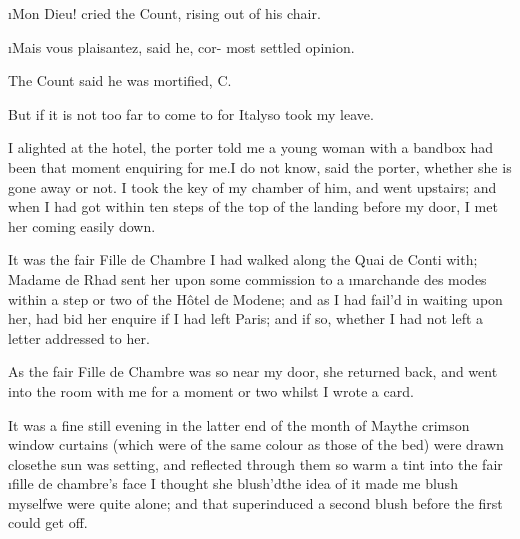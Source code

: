 \documentclass[twoside]{article}
\begin{document}
\i{Mon Dieu!} cried the Count, rising\break
out of his chair.

\i{Mais vous plaisantez}, said he, cor-\break
{}
most settled opinion.

The Count said he was mortified,\break
{}
C\anon.

But if it is not too far to come to\break
{}
for Italy\tskk so took my leave.



\vskip 0pt

 I alighted at the hotel,\break
the porter told me a young woman with a
bandbox had been that moment enquiring for
me.\tskk I do not know, said the porter,
whether she is gone away or not.  I took
the key of my chamber of him, and went
upstairs; and when I had got within ten
steps of the top of the landing before my
door, I met her coming easily down.

It was the fair Fille de Chambre I had
walked along the Quai de Conti with;
Madame de R\tskk  had sent her upon some
commission to a \i{marchande des modes}
within a step or two of the Hôtel de
Modene; and as I had fail’d in waiting
upon her, had bid her enquire if I had
left Paris; and if so, whether I had not
left a letter addressed to her.

As the fair Fille de Chambre was so
near my door, she returned back, and went
into the room with me for a moment or two
whilst I wrote a card.

It was a fine still evening in the latter
end of the month of May\tskk the crimson
window curtains (which were of the same
colour as those of the bed) were drawn
close\tskk the sun was setting, and
reflected through them so warm a tint into
the fair \i{fille de chambre’s} face\tskk
I thought she blush’d\tskk the idea of it
made me blush myself\tskk we were quite
alone; and that superinduced a second
blush before the first could get off.
\end{document}
